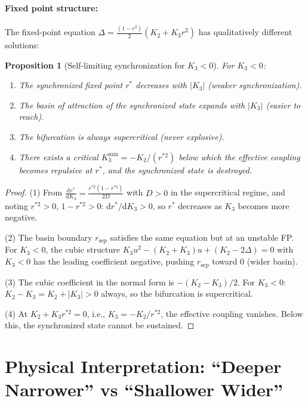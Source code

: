 \documentclass[11pt]{article}
\newcommand{\dd}{\mathrm{d}}
\newtheorem{proposition}{Proposition}
\begin{document}
\paragraph{Fixed point structure:}
The fixed-point equation $\Delta = \frac{(1-r^2)}{2}(K_2 + K_3 r^2)$
has qualitatively different solutions:

\begin{proposition}[Self-limiting synchronization for $K_3<0$]
  For $K_3 < 0$:
  \begin{enumerate}
    \item The synchronized fixed point $r^*$ \emph{decreases} with $|K_3|$
      (weaker synchronization).
    \item The basin of attraction of the synchronized state \emph{expands}
      with $|K_3|$ (easier to reach).
    \item The bifurcation is always supercritical (never explosive).
    \item There exists a critical $K_3^{\min} = -K_2/(r^{*2})$ below which
      the effective coupling becomes repulsive at $r^*$, and the synchronized
      state is destroyed.
  \end{enumerate}
\end{proposition}

\begin{proof}
  (1) From $\frac{\dd r^*}{\dd K_3} = \frac{r^{*2}(1-r^{*2})}{2D}$ with
  $D>0$ in the supercritical regime, and noting $r^{*2}>0$, $1-r^{*2}>0$:
  $\dd r^*/\dd K_3 > 0$, so $r^*$ decreases as $K_3$ becomes more negative.

  (2) The basin boundary $r_{\mathrm{sep}}$ satisfies the same equation
  but at an unstable FP.  For $K_3<0$, the cubic structure
  $K_3 u^2 - (K_2+K_3)u + (K_2-2\Delta)=0$ with $K_3<0$ has the
  leading coefficient negative, pushing $r_{\mathrm{sep}}$ toward 0
  (wider basin).

  (3) The cubic coefficient in the normal form is $-(K_2-K_3)/2$.
  For $K_3<0$: $K_2-K_3 = K_2+|K_3| > 0$ always, so the bifurcation
  is supercritical.

  (4) At $K_2 + K_3 r^{*2} = 0$, i.e., $K_3 = -K_2/r^{*2}$, the
  effective coupling vanishes. Below this, the synchronized state
  cannot be sustained.
\end{proof}

\section{Physical Interpretation: ``Deeper Narrower'' vs ``Shallower Wider''}
\end{document}
